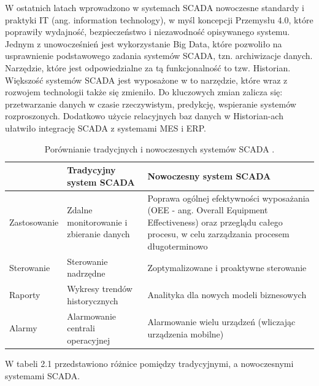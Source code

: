 W ostatnich latach wprowadzono w systemach SCADA nowoczesne standardy i praktyki IT (ang. information technology), w myśl koncepcji Przemysłu 4.0, które poprawiły wydajność, bezpieczeństwo i niezawodność opisywanego systemu. Jednym z unowocześnień jest wykorzystanie Big Data, które pozwoliło na usprawnienie podstawowego zadania systemów SCADA, tzn. archiwizacje danych. Narzędzie, które jest odpowiedzialne za tą funkcjonalność to tzw. Historian. Większość systemów SCADA jest wyposażone w to narzędzie, które wraz z rozwojem technologii także się zmieniło. Do kluczowych zmian zalicza się: przetwarzanie danych w czasie rzeczywistym, predykcję, wspieranie systemów rozproszonych. Dodatkowo użycie relacyjnych baz danych w Historian-ach ułatwiło integrację SCADA z systemami MES i ERP. 

\begin{table}[htbp]
	\renewcommand{\arraystretch}{1.5}
	\label{tab:SCADAPorownanie}
	\begin{tabular}{| >{\centering\arraybackslash}m{2.5cm} | >{\centering\arraybackslash}m{6cm} |>{\centering\arraybackslash}m{6.5cm} |}
		\hline 
		& \Large  Tradycyjny system SCADA & \Large  Nowoczesny system SCADA\\ 
		\hline 
		Zastosowanie & 
		Zdalne monitorowanie i zbieranie danych & 
		Poprawa ogólnej efektywności wyposażania (OEE - ang. Overall Equipment Effectiveness) oraz przeglądu całego procesu, w celu zarządzania procesem długoterminowo  \\ 
		\hline
		Sterowanie & 
		Sterowanie nadrzędne &
		Zoptymalizowane i proaktywne sterowanie  \\ 
		\hline
		Raporty & 
		Wykresy trendów historycznych & 
		Analityka dla nowych modeli biznesowych\\ 
		\hline
		Alarmy & 
		Alarmowanie centrali operacyjnej & 
		Alarmowanie wielu urządzeń (wliczając urządzenia mobilne)  \\ 
		\hline
	\end{tabular} 
	\caption{Porównianie tradycjnych i nowoczesnych systemów SCADA \cite{SCADATabela}.}
\end{table}

W tabeli 2.1 przedstawiono różnice pomiędzy tradycyjnymi, a nowoczesnymi systemami SCADA.








